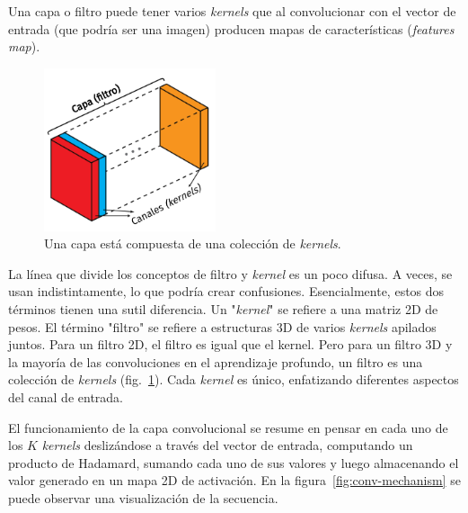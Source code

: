 \documentclass[a4paper,12pt]{article}
\begin{document}
Una capa o filtro puede tener varios \textit{kernels} que al convolucionar con el vector de entrada (que podría ser una imagen) producen mapas de características (\textit{features map}).

\begin{figure}[H]
	\begin{center}				
		\includegraphics[width=0.45\textwidth]{layer-kernels.png}
		\caption{Una capa está compuesta de una colección de \textit{kernels}.}
		\label{fig:layer-kernel}
	\end{center}
\end{figure}

La línea que divide los conceptos de filtro y \textit{kernel} es un poco difusa. A veces, se usan indistintamente, lo que podría crear confusiones. Esencialmente, estos dos términos tienen una sutil diferencia. Un "\textit{kernel}" se refiere a una matriz 2D de pesos. El término "filtro" se refiere a estructuras 3D de varios \textit{kernels} apilados juntos. Para un filtro 2D, el filtro es igual que el kernel. Pero para un filtro 3D y la mayoría de las convoluciones en el aprendizaje profundo, un filtro es una colección de \textit{kernels} (fig.~\ref{fig:layer-kernel}). Cada \textit{kernel} es único, enfatizando diferentes aspectos del canal de entrada.

El funcionamiento de la capa convolucional se resume en pensar en cada uno de los $K$ \textit{kernels} deslizándose a través del vector de entrada, computando un producto de Hadamard, sumando cada uno de sus valores y luego almacenando el valor generado en un mapa 2D de activación. En la figura~\ref{fig:conv-mechanism} se puede observar una visualización de la secuencia.
\end{document}
